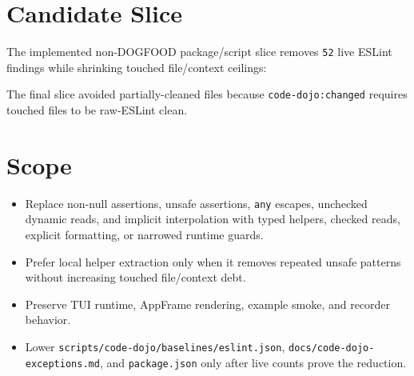 \section{Candidate Slice}\label{record-225-candidate-slice}

The implemented non-DOGFOOD package/script slice removes \texttt{5\allowbreak{}2} live ESLint findings while shrinking touched file/context ceilings:



The final slice avoided partially-cleaned files because \texttt{c\allowbreak{}o\allowbreak{}d\allowbreak{}e\allowbreak{}-\allowbreak{}d\allowbreak{}o\allowbreak{}j\allowbreak{}o\allowbreak{}:\allowbreak{}c\allowbreak{}h\allowbreak{}a\allowbreak{}n\allowbreak{}g\allowbreak{}e\allowbreak{}d} requires touched files to be raw-ESLint clean.

\section{Scope}\label{record-225-scope}

\begin{itemize}
\tightlist
\item
  Replace non-null assertions, unsafe assertions, \texttt{a\allowbreak{}n\allowbreak{}y} escapes, unchecked dynamic reads, and implicit interpolation with typed helpers, checked reads, explicit formatting, or narrowed runtime guards.
\item
  Prefer local helper extraction only when it removes repeated unsafe patterns without increasing touched file/context debt.
\item
  Preserve TUI runtime, AppFrame rendering, example smoke, and recorder behavior.
\item
  Lower \texttt{s\allowbreak{}c\allowbreak{}r\allowbreak{}i\allowbreak{}p\allowbreak{}t\allowbreak{}s\allowbreak{}/\allowbreak{}c\allowbreak{}o\allowbreak{}d\allowbreak{}e\allowbreak{}-\allowbreak{}d\allowbreak{}o\allowbreak{}j\allowbreak{}o\allowbreak{}/\allowbreak{}b\allowbreak{}a\allowbreak{}s\allowbreak{}e\allowbreak{}l\allowbreak{}i\allowbreak{}n\allowbreak{}e\allowbreak{}s\allowbreak{}/\allowbreak{}e\allowbreak{}s\allowbreak{}l\allowbreak{}i\allowbreak{}n\allowbreak{}t\allowbreak{}.\allowbreak{}j\allowbreak{}s\allowbreak{}o\allowbreak{}n}, \texttt{d\allowbreak{}o\allowbreak{}c\allowbreak{}s\allowbreak{}/\allowbreak{}c\allowbreak{}o\allowbreak{}d\allowbreak{}e\allowbreak{}-\allowbreak{}d\allowbreak{}o\allowbreak{}j\allowbreak{}o\allowbreak{}-\allowbreak{}e\allowbreak{}x\allowbreak{}c\allowbreak{}e\allowbreak{}p\allowbreak{}t\allowbreak{}i\allowbreak{}o\allowbreak{}n\allowbreak{}s\allowbreak{}.\allowbreak{}m\allowbreak{}d}, and \texttt{p\allowbreak{}a\allowbreak{}c\allowbreak{}k\allowbreak{}a\allowbreak{}g\allowbreak{}e\allowbreak{}.\allowbreak{}j\allowbreak{}s\allowbreak{}o\allowbreak{}n} only after live counts prove the reduction.
\end{itemize}


